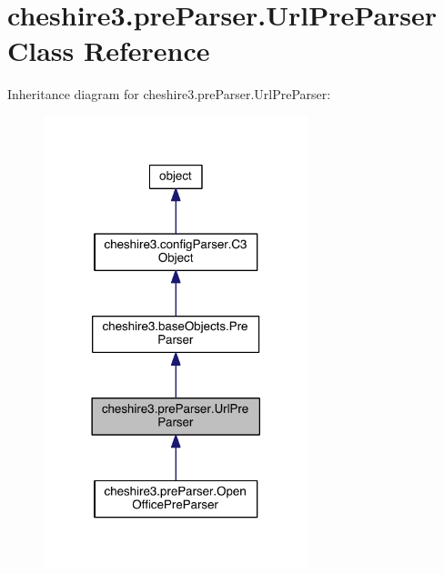 \hypertarget{classcheshire3_1_1pre_parser_1_1_url_pre_parser}{\section{cheshire3.\-pre\-Parser.\-Url\-Pre\-Parser Class Reference}
\label{classcheshire3_1_1pre_parser_1_1_url_pre_parser}
}


Inheritance diagram for cheshire3.\-pre\-Parser.\-Url\-Pre\-Parser\-:
\nopagebreak
\begin{figure}[H]
\begin{center}
\leavevmode
\includegraphics[width=218pt]{classcheshire3_1_1pre_parser_1_1_url_pre_parser__inherit__graph}
\end{center}
\end{figure}


